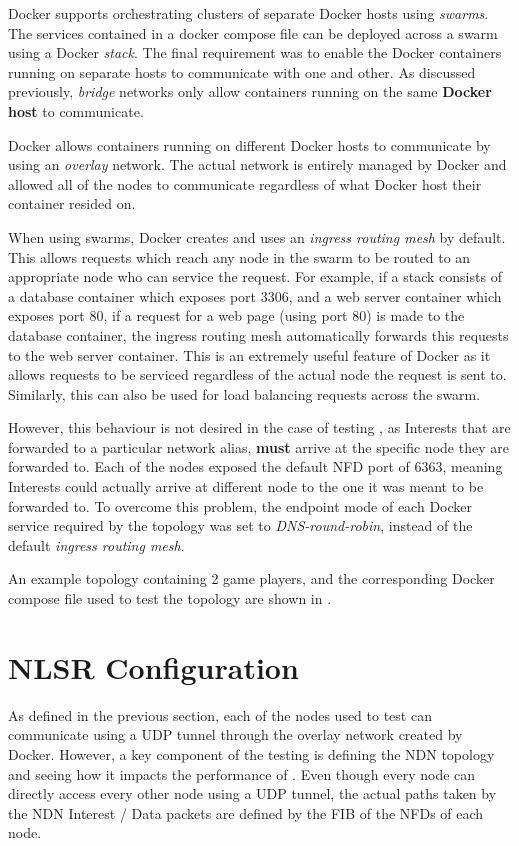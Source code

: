 Docker supports orchestrating clusters of separate Docker hosts using \textit{swarms}. The services contained in a docker compose file can be deployed across a swarm using a Docker \textit{stack}. The final requirement was to enable the Docker containers running on separate hosts to communicate with one and other. As discussed previously, \textit{bridge} networks only allow containers running on the same \textbf{Docker host} to communicate.

Docker allows containers running on different Docker hosts to communicate by using an \textit{overlay} network. The actual network is entirely managed by Docker and allowed all of the \game{} nodes to communicate regardless of what Docker host their container resided on. 

When using swarms, Docker creates and uses an \textit{ingress routing mesh} by default. This allows requests which reach any node in the swarm to be routed to an appropriate node who can service the request. For example, if a stack consists of a database container which exposes port 3306, and a web server container which exposes port 80, if a request for a web page (using port 80) is made to the database container, the ingress routing mesh automatically forwards this requests to the web server container. This is an extremely useful feature of Docker as it allows requests to be serviced regardless of the actual node the request is sent to. Similarly, this can also be used for load balancing requests across the swarm.

However, this behaviour is not desired in the case of testing \game{}, as Interests that are forwarded to a particular network alias, \textbf{must} arrive at the specific node they are forwarded to. Each of the nodes exposed the default NFD port of 6363, meaning Interests could actually arrive at different node to the one it was meant to be forwarded to. To overcome this problem, the endpoint mode of each Docker service required by the topology was set to \textit{DNS-round-robin}, instead of the default \textit{ingress routing mesh}.

An example topology containing 2 game players, and the corresponding Docker compose file used to test the topology are shown in .



\section{NLSR Configuration}\label{sec:impl:topologies}
As defined in the previous section, each of the nodes used to test \game{} can communicate using a UDP tunnel through the overlay network created by Docker. However, a key component of the testing is defining the NDN topology and seeing how it impacts the performance of \game{}. Even though every node can directly access every other node using a UDP tunnel, the actual paths taken by the NDN Interest / Data packets are defined by the FIB of the NFDs of each node. 

